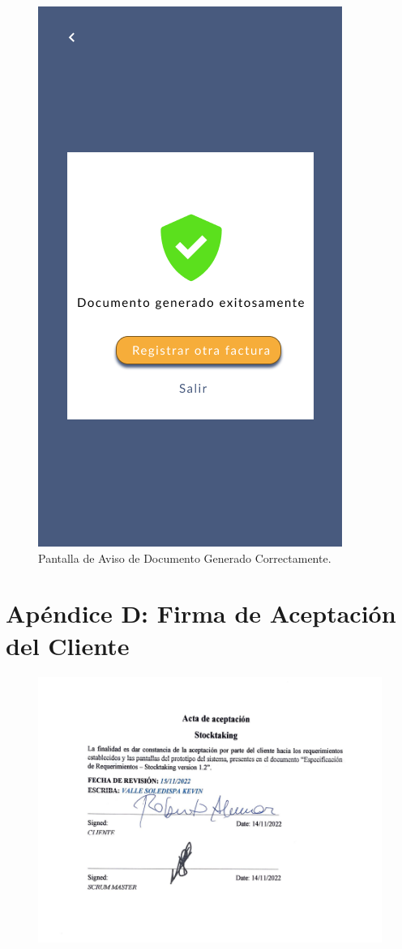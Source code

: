 \documentclass{scrreprt}
\begin{document}
    \begin{figure}[!htpb]
        \centerline{\includegraphics[scale=.35]{images/prototype/mobile/iPhone 8 - 8.png}}
        \caption{Pantalla de Aviso de Documento Generado Correctamente.}
        \label{fig}
    \end{figure}
    \FloatBarrier  

\section{Apéndice D: Firma de Aceptación del Cliente}
    \begin{figure}[ht]
        \centerline{\includegraphics[width=\textwidth]{images/legal_stuff/aceptacion.png}}
    \end{figure}
    \FloatBarrier  
\end{document}
